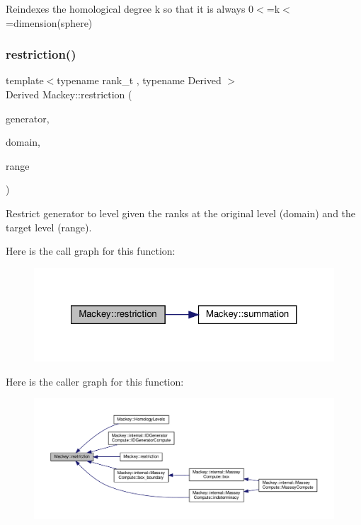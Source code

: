 Reindexes the homological degree k so that it is always 0$<$=k$<$=dimension(sphere) 

\mbox{\label{namespaceMackey_a7defa0afa64fdb038a657493db47e13e}} 
\subsubsection{\texorpdfstring{restriction()}{restriction()}\hspace{0.1cm}{\footnotesize\ttfamily [1/2]}}
{\footnotesize\ttfamily template$<$typename rank\+\_\+t , typename Derived $>$ \\
Derived Mackey\+::restriction (\begin{DoxyParamCaption}\item[{const Eigen\+::\+Matrix\+Base$<$ Derived $>$ \&}]{generator,  }\item[{const rank\+\_\+t \&}]{domain,  }\item[{const rank\+\_\+t \&}]{range }\end{DoxyParamCaption})}



Restrict generator to level given the ranks at the original level (domain) and the target level (range). 

Here is the call graph for this function\+:\nopagebreak
\begin{figure}[H]
\begin{center}
\leavevmode
\includegraphics[width=321pt]{namespaceMackey_a7defa0afa64fdb038a657493db47e13e_cgraph}
\end{center}
\end{figure}
Here is the caller graph for this function\+:\nopagebreak
\begin{figure}[H]
\begin{center}
\leavevmode
\includegraphics[width=350pt]{namespaceMackey_a7defa0afa64fdb038a657493db47e13e_icgraph}
\end{center}
\end{figure}
\mbox{\label{namespaceMackey_a6818760aa9590810daace862e4c71f04}} 
